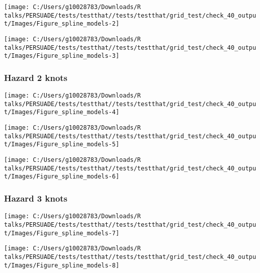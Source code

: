 \documentclass[
]{article}
\begin{document}
\begin{flushleft}\texttt{[image: C:/Users/g10028783/Downloads/R talks/PERSUADE/tests/testthat//tests/testthat/grid\_test/check\_40\_output/Images/Figure\_spline\_models-2]} \end{flushleft}

\begin{flushleft}\texttt{[image: C:/Users/g10028783/Downloads/R talks/PERSUADE/tests/testthat//tests/testthat/grid\_test/check\_40\_output/Images/Figure\_spline\_models-3]} \end{flushleft}

\clearpage

\subsubsection{Hazard 2 knots}\label{hazard-2-knots}

\begin{flushleft}\texttt{[image: C:/Users/g10028783/Downloads/R talks/PERSUADE/tests/testthat//tests/testthat/grid\_test/check\_40\_output/Images/Figure\_spline\_models-4]} \end{flushleft}

\begin{flushleft}\texttt{[image: C:/Users/g10028783/Downloads/R talks/PERSUADE/tests/testthat//tests/testthat/grid\_test/check\_40\_output/Images/Figure\_spline\_models-5]} \end{flushleft}

\begin{flushleft}\texttt{[image: C:/Users/g10028783/Downloads/R talks/PERSUADE/tests/testthat//tests/testthat/grid\_test/check\_40\_output/Images/Figure\_spline\_models-6]} \end{flushleft}

\clearpage

\subsubsection{Hazard 3 knots}\label{hazard-3-knots}

\begin{flushleft}\texttt{[image: C:/Users/g10028783/Downloads/R talks/PERSUADE/tests/testthat//tests/testthat/grid\_test/check\_40\_output/Images/Figure\_spline\_models-7]} \end{flushleft}

\begin{flushleft}\texttt{[image: C:/Users/g10028783/Downloads/R talks/PERSUADE/tests/testthat//tests/testthat/grid\_test/check\_40\_output/Images/Figure\_spline\_models-8]} \end{flushleft}
\end{document}
